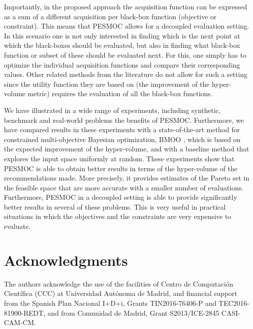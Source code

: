 \documentclass[review,preprint,12pt]{elsarticle}
\begin{document}
Importantly, in the proposed approach the acquisition function can be expressed
as a sum of a different acquisition per black-box function (objective or constraint).
This means that PESMOC allows for a decoupled evaluation setting. In this scenario one is 
not only interested in finding which is the next point at which the black-boxes should
be evaluated, but also in finding what black-box function or subset of these should be evaluated 
next. For this, one simply has to optimize the individual acquisition functions and compare their
corresponding values. Other related methods from the literature do not allow for such a setting
since the utility function they are based on (the improvement of the hyper-volume metric) requires 
the evaluation of all the black-box functions.

We have illustrated in a wide range of experiments, including synthetic, benchmark and real-world problems
the benefits of PESMOC. Furthermore, we have compared results in these experiments with
a state-of-the-art method for constrained multi-objective Bayesian optimization, BMOO \citep{feliot2015bayesian},
which is based on the expected improvement of the hyper-volume, and with a baseline method that explores the input 
space uniformly at random. These experiments show that PESMOC is able to obtain better results in 
terms of the hyper-volume of the recommendations made. More precisely, it provides estimates of the Pareto 
set in the feasible space that are more accurate with a smaller number of evaluations. Furthermore, PESMOC in a 
decoupled setting is able to provide significantly better results in several of these problems. This is very 
useful in practical situations in which the objectives and the constraints are very expensive to evaluate.

\section*{Acknowledgments}

{\small
The authors acknowledge the use of the facilities of Centro de Computaci\'on Cient\'ifica (CCC) at 
Universidad Aut\'onoma de Madrid, and financial support from the Spanish Plan Nacional I+D+i, 
Grants TIN2016-76406-P and TEC2016-81900-REDT, and from Comunidad de Madrid, Grant S2013/ICE-2845 CASI-CAM-CM. 
}




\end{document}
